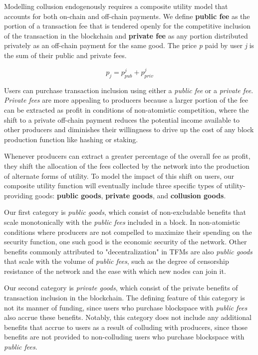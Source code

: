 \documentclass[oneside]{article}   	%
\begin{document}
Modelling collusion endogenously requires a composite utility model that accounts for both on-chain and off-chain payments. We define \textbf{public fee} as the portion of a transaction fee that is tendered openly for the competitive inclusion of the transaction in the blockchain and \textbf{private fee} as any portion distributed privately as an off-chain payment for the same good. The price \textit{p} paid by user \textit{j} is the sum of their public and private fees.

$$
p_j = p_{pub}^j + p_{priv}^j
$$

Users can purchase transaction inclusion using either a \textit{public fee} or a \textit{private fee}. \textit{Private fees} are more appealing to producers because a larger portion of the fee can be extracted as profit in conditions of non-atomistic competition, where the shift to a private off-chain payment reduces the potential income available to other producers and diminishes their willingness to drive up the cost of any block production function like hashing or staking.

Whenever producers can extract a greater percentage of the overall fee as profit, they shift the allocation of the fees collected by the network into the production of alternate forms of utility. To model the impact of this shift on users, our composite utility function will eventually include three specific types of utility-providing goods: \textbf{public goods}, \textbf{private goods}, and \textbf{collusion goods}.

Our first category is \textit{public goods}, which consist of non-excludable benefits that scale monotonically with the \textit{public fees} included in a block. In non-atomistic conditions where producers are not compelled to maximize their spending on the security function, one such good is the economic security of the network. Other benefits commonly attributed to "decentralization" in TFMs are also \textit{public goods} that scale with the volume of \textit{public fees}, such as the degree of censorship resistance of the network and the ease with which new nodes can join it.

Our second category is \textit{private goods}, which consist of the private benefits of transaction inclusion in the blockchain. The defining feature of this category is not its manner of funding, since users who purchase blockspace with \textit{public fees} also accrue these benefits. Notably, this category does not include any additional benefits that accrue to users as a result of colluding with producers, since those benefits are not provided to non-colluding users who purchase blockspace with \textit{public fees}.
\end{document}
